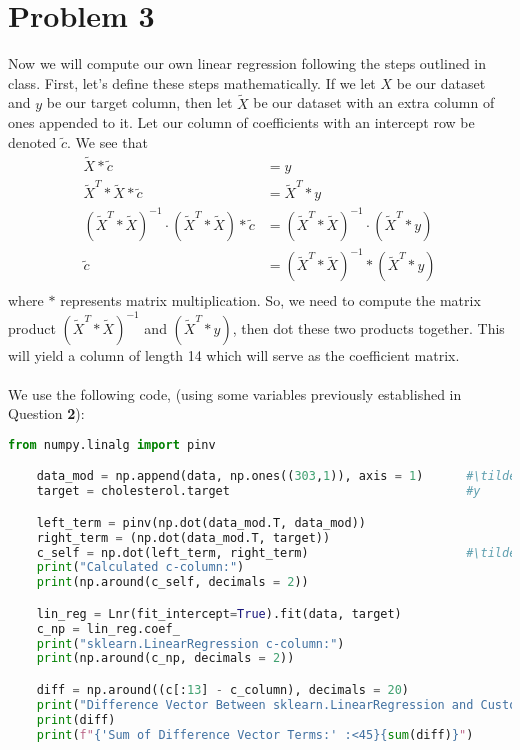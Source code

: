 \documentclass[12pt, letterpaper]{article}
\begin{document}
\newpage
\noindent\makebox[\linewidth]{\rule{18cm}{0.4pt}}
\section*{Problem 3}

Now we will compute our own linear regression following the steps outlined in class. First, let's define
these steps mathematically. If we let $X$ be our dataset and $y$ be our target column, then let 
$\tilde{X}$ be our dataset with an extra column of ones appended to it. Let our column of coefficients 
with an intercept row be denoted $\tilde{c}$. We see that 
\begin{align*}
    \tilde{X} * \tilde{c} &= y\\
    \tilde{X}^{T} * \tilde{X} * \tilde{c} &= \tilde{X}^{T} * y\\ 
    (\tilde{X}^{T} * \tilde{X})^{-1} \cdot (\tilde{X}^{T} * \tilde{X}) * \tilde{c} &= (\tilde{X}^{T} * \tilde{X})^{-1} \cdot (\tilde{X}^{T} * y)\\ 
    \tilde{c} &= (\tilde{X}^{T} * \tilde{X})^{-1} * (\tilde{X}^{T} * y) \\ 
\end{align*}
where $*$ represents matrix multiplication. So, we need to compute 
the matrix product $(\tilde{X}^{T} * \tilde{X})^{-1}$ and $(\tilde{X}^{T} * y)$, then dot these two products 
together. This will yield a column of length 14 which will serve as the coefficient matrix. \\ \\
We use the following code, (using some variables previously established in Question {\bf 2}):
\begin{lstlisting}[language=python]
    from numpy.linalg import pinv 

    data_mod = np.append(data, np.ones((303,1)), axis = 1)      #\tilde{X}
    target = cholesterol.target                                 #y

    left_term = pinv(np.dot(data_mod.T, data_mod))
    right_term = (np.dot(data_mod.T, target))
    c_self = np.dot(left_term, right_term)                      #\tilde{c}
    print("Calculated c-column:")
    print(np.around(c_self, decimals = 2))

    lin_reg = Lnr(fit_intercept=True).fit(data, target)
    c_np = lin_reg.coef_
    print("sklearn.LinearRegression c-column:")
    print(np.around(c_np, decimals = 2))

    diff = np.around((c[:13] - c_column), decimals = 20)
    print("Difference Vector Between sklearn.LinearRegression and Custom Regression:")
    print(diff)
    print(f"{'Sum of Difference Vector Terms:' :<45}{sum(diff)}")
\end{lstlisting}
\end{document}
